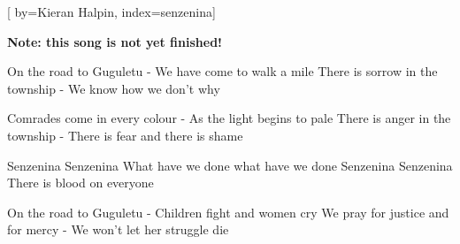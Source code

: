 
[%
    by={Kieran Halpin},
    index={senzenina}]


    \label{senzenina}

    \textbf{Note: this song is not yet finished!}

    \beginverse
        On the road to Guguletu - We have come to walk a mile
        There is sorrow in the township - We know how we don’t why
    \endverse

    \beginverse
        Comrades come in every colour - As the light begins to pale
        There is anger in the township - There is fear and there is shame
    \endverse

    \beginchorus
        Senzenina    Senzenina   What have we done what have we done
        Senzenina    Senzenina  There is blood on everyone
    \endchorus

    \beginverse
        On the road to Guguletu - Children fight and women cry
        We pray for justice and for mercy - We won't let her struggle die
    \endverse
\endsong

